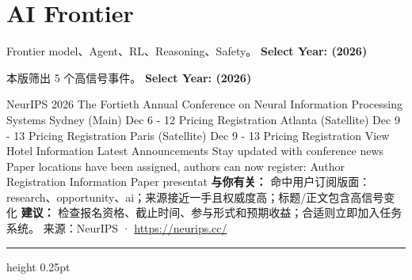 \documentclass[10.5pt]{ctexart}
\begin{document}
\section*{AI Frontier}
{\color{ormuted} Frontier model、Agent、RL、Reasoning、Safety。}
\vspace{2mm}
{\LARGE\bfseries Select Year: (2026)}\par
\vspace{1mm}
{\color{ormuted} 本版筛出 5 个高信号事件。}
\vspace{3mm}
{\Large\bfseries Select Year: (2026)}\par
NeurIPS 2026 The Fortieth Annual Conference on Neural Information Processing Systems Sydney (Main) Dec 6 - 12 Pricing Registration Atlanta (Satellite) Dec 9 - 13 Pricing Registration Paris (Satellite) Dec 9 - 13 Pricing Registration View Hotel Information Latest Announcements Stay updated with conference news Paper locations have been assigned, authors can now register: Author Registration Information Paper presentat
\textbf{与你有关：} 命中用户订阅版面：research、opportunity、ai；来源接近一手且权威度高；标题/正文包含高信号变化
\textbf{建议：} 检查报名资格、截止时间、参与形式和预期收益；合适则立即加入任务系统。
{\footnotesize\color{ormuted} 来源：NeurIPS · \url{https://neurips.cc/}}
\vspace{4mm}
\hrule height 0.25pt
\vspace{3mm}
\end{document}
